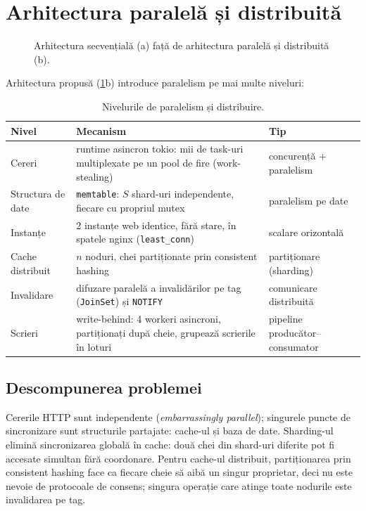 \section{Arhitectura paralelă și distribuită}
\label{sec:paralel}

\begin{figure}[H]
  \centering
  \resizebox{0.95\linewidth}{!}{}
  \caption{Arhitectura secvențială (a) față de arhitectura paralelă și distribuită (b).}
  \label{fig:seqpar}
\end{figure}

Arhitectura propusă (\cref{fig:seqpar}b) introduce paralelism pe mai multe niveluri:

\begin{table}[H]
\centering\small
\begin{tabularx}{\linewidth}{lXl}
\toprule
Nivel & Mecanism & Tip \\
\midrule
Cereri & runtime asincron tokio: mii de task-uri multiplexate pe un pool de fire (work-stealing) & concurență + paralelism \\
Structura de date & \texttt{memtable}: $S$ shard-uri independente, fiecare cu propriul mutex & paralelism pe date \\
Instanțe & 2 instanțe web identice, fără stare, în spatele nginx (\texttt{least\_conn}) & scalare orizontală \\
Cache distribuit & $n$ noduri, chei partiționate prin consistent hashing & partiționare (sharding) \\
Invalidare & difuzare paralelă a invalidărilor pe tag (\texttt{JoinSet}) și \texttt{NOTIFY} & comunicare distribuită \\
Scrieri & write-behind: 4 workeri asincroni, partiționați după cheie, grupează scrierile în loturi & pipeline producător–consumator \\
\bottomrule
\end{tabularx}
\caption{Nivelurile de paralelism și distribuire.}
\end{table}

\subsection{Descompunerea problemei}

Cererile HTTP sunt independente (\emph{embarrassingly parallel}); singurele puncte de sincronizare sunt
structurile partajate: cache-ul și baza de date. Sharding-ul elimină sincronizarea globală în cache:
două chei din shard-uri diferite pot fi accesate simultan fără coordonare. Pentru cache-ul distribuit,
partiționarea prin consistent hashing face ca fiecare cheie să aibă un singur proprietar, deci nu este
nevoie de protocoale de consens; singura operație care atinge toate nodurile este invalidarea pe tag.

